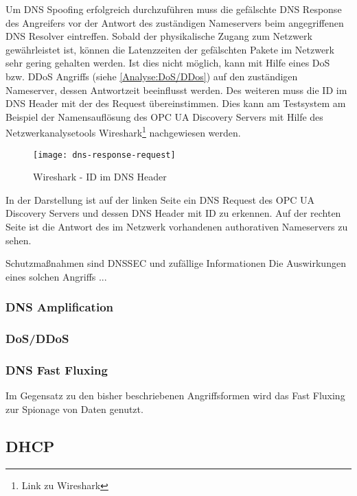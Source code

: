 Um \ac{DNS} Spoofing erfolgreich durchzuführen muss die gefälschte \ac{DNS} Response des Angreifers vor der Antwort des zuständigen Nameservers beim angegriffenen \ac{DNS} Resolver eintreffen. Sobald der physikalische Zugang zum Netzwerk gewährleistet ist, können die Latenzzeiten der gefälschten Pakete im Netzwerk sehr gering gehalten werden. Ist dies nicht möglich, kann mit Hilfe eines \ac{DoS} bzw. \ac{DDoS} Angriffs (siehe \autoref{Analyse:DoS/DDos}) auf den zuständigen Nameserver, dessen Antwortzeit beeinflusst werden. Des weiteren muss die ID im \ac{DNS} Header mit der des Request übereinstimmen. Dies kann am Testsystem am Beispiel der Namensauflösung des \ac{OPC UA} Discovery Servers mit Hilfe des Netzwerkanalysetools Wireshark\footnote{Link zu Wireshark} nachgewiesen werden.

\begin{figure}[h]
    \centering
    \texttt{[image: dns-response-request]}
    \caption{Wireshark - ID im DNS Header}
    \label{Analyse:DNS Request Response}
  \end{figure}
  
\clearpage

In der Darstellung ist auf der linken Seite ein DNS Request des \ac{OPC UA} Discovery Servers und dessen DNS Header mit ID zu erkennen. Auf der rechten Seite ist die Antwort des im Netzwerk vorhandenen authorativen Nameservers zu sehen. 

Schutzmaßnahmen sind DNSSEC und zufällige Informationen
Die Auswirkungen eines solchen Angriffs ...

\subsubsection{DNS Amplification}


\subsubsection{\ac{DoS}/\ac{DDoS}}
\label{Analyse:DoS/DDos}

\subsubsection{DNS Fast Fluxing}
Im Gegensatz zu den bisher beschriebenen Angriffsformen wird das Fast Fluxing zur Spionage von Daten genutzt.

\subsection{DHCP}



